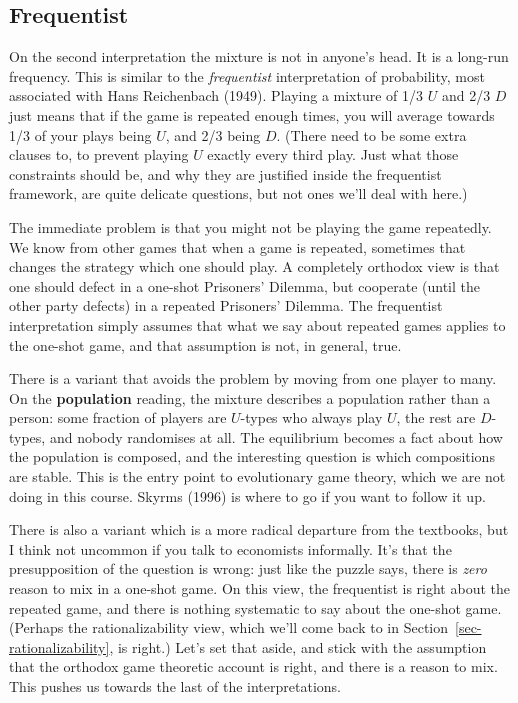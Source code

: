 \documentclass[
  11pt,
  letterpaper,
]{scrbook}
\begin{document}
\subsection{Frequentist}\label{frequentist}

On the second interpretation the mixture is not in anyone's head. It is
a long-run frequency. This is similar to the \emph{frequentist}
interpretation of probability, most associated with Hans Reichenbach
(1949). Playing a mixture of 1/3 \(U\) and 2/3 \(D\) just means that if
the game is repeated enough times, you will average towards 1/3 of your
plays being \(U\), and 2/3 being \(D\). (There need to be some extra
clauses to, to prevent playing \(U\) exactly every third play. Just what
those constraints should be, and why they are justified inside the
frequentist framework, are quite delicate questions, but not ones we'll
deal with here.)

The immediate problem is that you might not be playing the game
repeatedly. We know from other games that when a game is repeated,
sometimes that changes the strategy which one should play. A completely
orthodox view is that one should defect in a one-shot Prisoners'
Dilemma, but cooperate (until the other party defects) in a repeated
Prisoners' Dilemma. The frequentist interpretation simply assumes that
what we say about repeated games applies to the one-shot game, and that
assumption is not, in general, true.

There is a variant that avoids the problem by moving from one player to
many. On the \textbf{population} reading, the mixture describes a
population rather than a person: some fraction of players are
\(U\)-types who always play \(U\), the rest are \(D\)-types, and nobody
randomises at all. The equilibrium becomes a fact about how the
population is composed, and the interesting question is which
compositions are stable. This is the entry point to evolutionary game
theory, which we are not doing in this course. Skyrms (1996) is where to
go if you want to follow it up.

There is also a variant which is a more radical departure from the
textbooks, but I think not uncommon if you talk to economists
informally. It's that the presupposition of the question is wrong: just
like the puzzle says, there is \emph{zero} reason to mix in a one-shot
game. On this view, the frequentist is right about the repeated game,
and there is nothing systematic to say about the one-shot game. (Perhaps
the rationalizability view, which we'll come back to in
Section~\ref{sec-rationalizability}, is right.) Let's set that aside,
and stick with the assumption that the orthodox game theoretic account
is right, and there is a reason to mix. This pushes us towards the last
of the interpretations.
\end{document}
